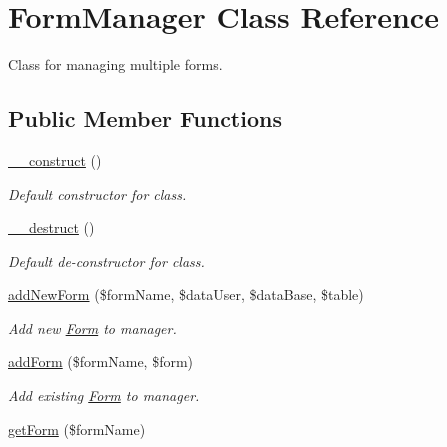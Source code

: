\hypertarget{class_form_manager}{\section{Form\-Manager Class Reference}
\label{class_form_manager}
}


Class for managing multiple forms.  


\subsection*{Public Member Functions}
\begin{DoxyCompactItemize}
\item 
\hypertarget{class_form_manager_a095c5d389db211932136b53f25f39685}{\hyperlink{class_form_manager_a095c5d389db211932136b53f25f39685}{\-\_\-\-\_\-construct} ()}\label{class_form_manager_a095c5d389db211932136b53f25f39685}

\begin{DoxyCompactList}\small\item\em Default constructor for class. \end{DoxyCompactList}\item 
\hypertarget{class_form_manager_a421831a265621325e1fdd19aace0c758}{\hyperlink{class_form_manager_a421831a265621325e1fdd19aace0c758}{\-\_\-\-\_\-destruct} ()}\label{class_form_manager_a421831a265621325e1fdd19aace0c758}

\begin{DoxyCompactList}\small\item\em Default de-\/constructor for class. \end{DoxyCompactList}\item 
\hyperlink{class_form_manager_a50b1ff6a4b3cfefd80263845f9e27437}{add\-New\-Form} (\$form\-Name, \$data\-User, \$data\-Base, \$table)
\begin{DoxyCompactList}\small\item\em Add new \hyperlink{class_form}{Form} to manager. \end{DoxyCompactList}\item 
\hyperlink{class_form_manager_aef87575c4539e539e6607476d914812e}{add\-Form} (\$form\-Name, \$form)
\begin{DoxyCompactList}\small\item\em Add existing \hyperlink{class_form}{Form} to manager. \end{DoxyCompactList}\item 
\hypertarget{class_form_manager_adfc32aa39bda3ade893abc1088e4d80c}{\hyperlink{class_form_manager_adfc32aa39bda3ade893abc1088e4d80c}{get\-Form} (\$form\-Name)}\label{class_form_manager_adfc32aa39bda3ade893abc1088e4d80c}


\end{DoxyCompactItemize}
